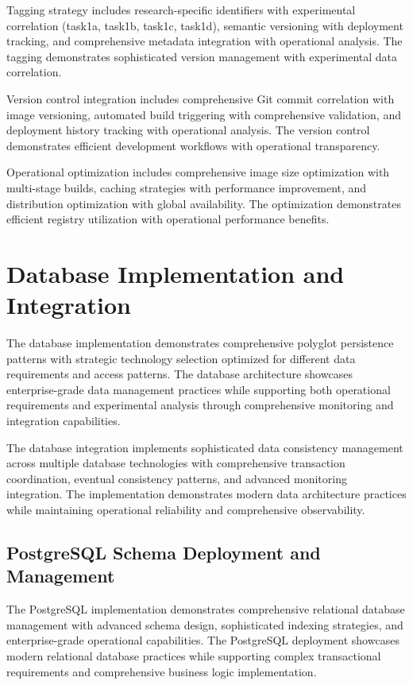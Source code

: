 Tagging strategy includes research-specific identifiers with experimental correlation (task1a, task1b, task1c, task1d), semantic versioning with deployment tracking, and comprehensive metadata integration with operational analysis. The tagging demonstrates sophisticated version management with experimental data correlation.

Version control integration includes comprehensive Git commit correlation with image versioning, automated build triggering with comprehensive validation, and deployment history tracking with operational analysis. The version control demonstrates efficient development workflows with operational transparency.

Operational optimization includes comprehensive image size optimization with multi-stage builds, caching strategies with performance improvement, and distribution optimization with global availability. The optimization demonstrates efficient registry utilization with operational performance benefits.

\section{Database Implementation and Integration}

The database implementation demonstrates comprehensive polyglot persistence patterns with strategic technology selection optimized for different data requirements and access patterns. The database architecture showcases enterprise-grade data management practices while supporting both operational requirements and experimental analysis through comprehensive monitoring and integration capabilities.

The database integration implements sophisticated data consistency management across multiple database technologies with comprehensive transaction coordination, eventual consistency patterns, and advanced monitoring integration. The implementation demonstrates modern data architecture practices while maintaining operational reliability and comprehensive observability.

\subsection{PostgreSQL Schema Deployment and Management}

The PostgreSQL implementation demonstrates comprehensive relational database management with advanced schema design, sophisticated indexing strategies, and enterprise-grade operational capabilities. The PostgreSQL deployment showcases modern relational database practices while supporting complex transactional requirements and comprehensive business logic implementation.

